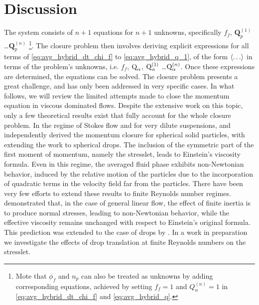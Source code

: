\section{Discussion}
\label{sec:conclusion}

The system consists of $n+1$ equations for $n+1$ unknowns, specifically $f_f$, $\textbf{Q}_p^{(1)}$\ldots$\textbf{Q}_p^{(n)}$ \footnote{Mote that $\phi_f$ and $n_p$ can also be treated as unknowns by adding corresponding equations, achieved by setting $f_f=1$ and $Q_\alpha^{(n)} =1$ in \ref{eq:avg_hybrid_dt_chi_f} and \ref{eq:avg_hybrid_q}.}.
 The closure problem then involves deriving explicit expressions for all terms of \ref{eq:avg_hybrid_dt_chi_f} to \ref{eq:avg_hybrid_q_1}, of the form $\left<\ldots\right>$ in terms of the problem's unknowns, i.e. 
 $f_f$, $\text Q_\alpha$, $\text Q_\alpha^{(1)}$ \ldots $ \text Q_\alpha^{(n)}$.  
 Once these expressions are determined, the equations can be solved. 
 The closure problem presents a great challenge, and has only been addressed in very specific cases. 
 In what follows, we will review the limited attempts made to close the momentum equation in viscous dominated flows. 
 Despite the extensive work on this topic, only a few theoretical results exist that fully account for the whole closure problem. 
 In the regime of Stokes flow and for very dilute suspensions, \citet{jackson1997locally} and \citet{zhang1997momentum} independently derived the momentum closure for spherical solid particles, with \citet{zhang1997momentum} extending the work to spherical drops. 
 The inclusion of the symmetric part of the first moment of momentum, namely the stresslet, leads to Einstein's viscosity formula. 
 Even in this regime, the averaged fluid phase exhibits non-Newtonian behavior, induced by the relative motion of the particles due to the incorporation of quadratic terms in the velocity field far from the particles.
 There have been very few efforts to extend these results to finite Reynolds number regimes. \citet{stone2001inertial} demonstrated that, in the case of general linear flow, the effect of finite inertia is to produce normal stresses, leading to non-Newtonian behavior, while the effective viscosity remains unchanged with respect to Einstein's original formula. 
 This prediction was extended to the case of drops by \citet{raja2010inertial}. 
 In a work in preparation we investigate the effects of drop translation at finite Reynolds numbers on the stresslet.


